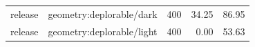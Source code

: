 \begin{longtable}{l>{\raggedright\arraybackslash}p{.42\linewidth}rrr}
release & %
geometry:deplorable/dark & %
400 & %
34.25 & %
86.95 \\ %

release & %
geometry:deplorable/light & %
400 & %
0.00 & %
53.63 \\ %


\end{longtable}
